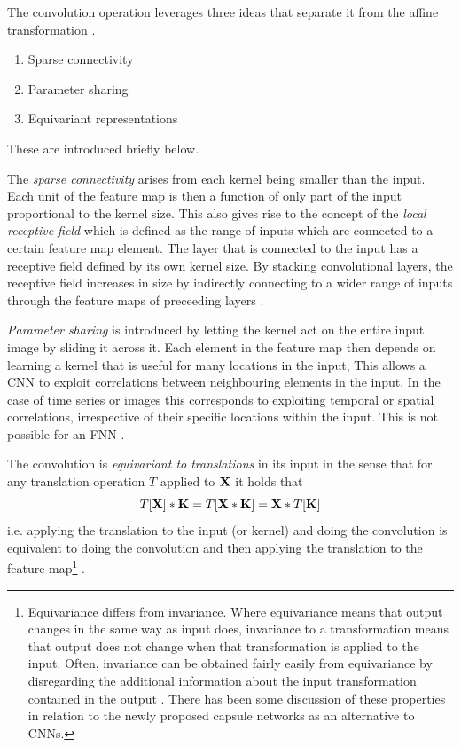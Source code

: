 The convolution operation leverages three ideas that separate it from the affine transformation \cite{Goodfellow2016}.
\begin{enumerate}
    \item Sparse connectivity
    \item Parameter sharing
    \item Equivariant representations
\end{enumerate}
These are introduced briefly below.

The \textit{sparse connectivity} arises from each kernel being smaller than the input. Each unit of the feature map is then a function of only part of the input proportional to the kernel size. This also gives rise to the concept of the \textit{local receptive field} which is defined as the range of inputs which are connected to a certain feature map element. The layer that is connected to the input has a receptive field defined by its own kernel size. By stacking convolutional layers, the receptive field increases in size by indirectly connecting to a wider range of inputs through the feature maps of preceeding layers \cite{Goodfellow2016}.

\textit{Parameter sharing} is introduced by letting the kernel act on the entire input image by sliding it across it. Each element in the feature map then depends on learning a kernel that is useful for many locations in the input, This allows a \gls{CNN} to exploit correlations between neighbouring elements in the input. In the case of time series or images this corresponds to exploiting temporal or spatial correlations, irrespective of their specific locations within the input. This is not possible for an \gls{FNN} \cite{Goodfellow2016}. 

The convolution is \textit{equivariant to translations} in its input in the sense that for any translation operation $T$ applied to ${\mathbf{X}}$ it holds that
\begin{equation}
    T{\left[{\mathbf{X}}\right]} * {\mathbf{K}} = T{\left[{\mathbf{X}} * {\mathbf{K}}\right]} = {\mathbf{X}} * T{\left[{\mathbf{K}}\right]}
\end{equation}
i.e. applying the translation to the input (or kernel) and doing the convolution is equivalent to doing the convolution and then applying the translation to the feature map\footnote{Equivariance differs from invariance. Where equivariance means that output changes in the same way as input does, invariance to a transformation means that output does not change when that transformation is applied to the input. Often, invariance can be obtained fairly easily from equivariance by disregarding the additional information about the input transformation contained in the output \cite{Goodfellow2016}. There has been some discussion of these properties in relation to the newly proposed capsule networks \cite{Sabour2017} as an alternative to \glspl{CNN}.} \cite{Goodfellow2016}.

